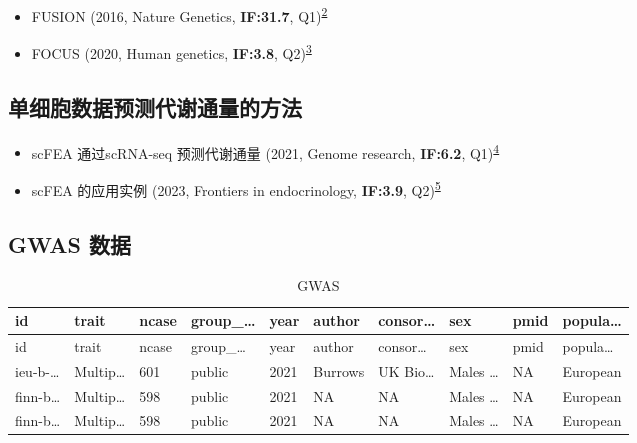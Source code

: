 \documentclass[
]{article}
\providecommand{\tightlist}{%
  \setlength{\itemsep}{0pt}\setlength{\parskip}{0pt}}
\begin{document}
\begin{itemize}
\tightlist
\item
  FUSION (2016, Nature Genetics, \textbf{IF:31.7}, Q1)\textsuperscript{\protect\hyperlink{ref-IntegrativeAppGusev2016}{2}}
\item
  FOCUS (2020, Human genetics, \textbf{IF:3.8}, Q2)\textsuperscript{\protect\hyperlink{ref-APowerfulFineWuCh2020}{3}}
\end{itemize}

\hypertarget{ux5355ux7ec6ux80deux6570ux636eux9884ux6d4bux4ee3ux8c22ux901aux91cfux7684ux65b9ux6cd5}{%
\subsection{单细胞数据预测代谢通量的方法}\label{ux5355ux7ec6ux80deux6570ux636eux9884ux6d4bux4ee3ux8c22ux901aux91cfux7684ux65b9ux6cd5}}

\begin{itemize}
\tightlist
\item
  scFEA 通过scRNA-seq 预测代谢通量 (2021, Genome research, \textbf{IF:6.2}, Q1)\textsuperscript{\protect\hyperlink{ref-AGraphNeuralAlgham2021}{4}}
\item
  scFEA 的应用实例 (2023, Frontiers in endocrinology, \textbf{IF:3.9}, Q2)\textsuperscript{\protect\hyperlink{ref-SingleCellCorAgoro2023}{5}}
\end{itemize}

\hypertarget{gwas-ux6570ux636e}{%
\subsection{GWAS 数据}\label{gwas-ux6570ux636e}}

\begin{center}\vspace{1.5cm}\end{center}

\begin{longtable}[]{@{}llllllllll@{}}
\caption{\label{tab:GWAS}GWAS}\tabularnewline
\toprule
id & trait & ncase & group\_\ldots{} & year & author & consor\ldots{} & sex & pmid & popula\ldots{}\tabularnewline
\midrule
\endfirsthead
\toprule
id & trait & ncase & group\_\ldots{} & year & author & consor\ldots{} & sex & pmid & popula\ldots{}\tabularnewline
\midrule
\endhead
ieu-b-\ldots{} & Multip\ldots{} & 601 & public & 2021 & Burrows & UK Bio\ldots{} & Males \ldots{} & NA & European\tabularnewline
finn-b\ldots{} & Multip\ldots{} & 598 & public & 2021 & NA & NA & Males \ldots{} & NA & European\tabularnewline
finn-b\ldots{} & Multip\ldots{} & 598 & public & 2021 & NA & NA & Males \ldots{} & NA & European\tabularnewline
\bottomrule
\end{longtable}
\end{document}
